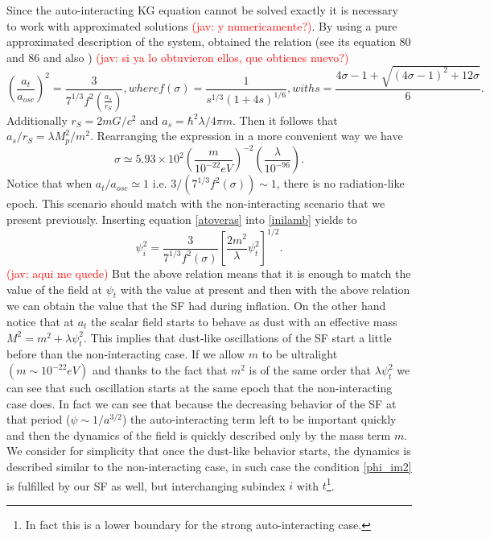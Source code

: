 \documentclass[amssymb,twocolumn,prd,nofootinbib,showpacs]{revtex4-1}
\newcommand{\jav}[1]{\textcolor{red}{(jav: #1)}}
\begin{document}
\begin{itemize}
Since the auto-interacting KG equation cannot be solved exactly it is necessary to work with approximated solutions \jav{y numericamente?}. 
By using a pure approximated description of the system,
 \cite{SFphi42} obtained the relation (see its equation 80 and 86 and also \cite{SFphi41}) 
 \jav{si ya lo obtuvieron ellos, que obtienes nuevo?}
\begin{subequations}
\begin{equation}\label{atoveras}
\left(\frac{a_t}{a_{osc}}\right)^2=\frac{3}{7^{1/3}f^2(\frac{a_s}{r_S})},
\end{equation}
where 
\begin{equation}
f(\sigma)=\frac{1}{s^{1/3}(1+4s)^{1/6}},
\end{equation}
with
\begin{equation}
s=\frac{4\sigma-1+\sqrt{(4\sigma-1)^2+12\sigma}}{6}.
\end{equation}
\end{subequations}
%
Additionally $r_S=2mG/c^2$ and $a_s=\hbar^2\lambda/4\pi m$. 
Then it follows that $a_s/r_S=\lambda M_p^2/m^2$. 
Rearranging the expression in a more convenient way we have
\begin{equation}
\sigma \simeq 5.93\times 10^{
2}\left(\frac{m}{10^{-22}eV}\right)^{-2}\left(\frac{\lambda}{10^{-96}}\right).
\end{equation}
%
Notice that when $a_t/a_{osc}\simeq 1$ i.e.  $3/(7^{1/3}f^2(\sigma))\sim 1$, there is no radiation-like epoch. 
This scenario should match with the non-interacting scenario that we present previously. 
Inserting equation \eqref{atoveras} into \eqref{inilamb} yields to
\begin{equation}\label{inilamb2}
\psi_i^2=\frac{3}{7^{1/3}f^2(\sigma)}\left[\frac{2m^2}{\lambda}\psi_t^2\right]^{1/2}.
\end{equation}
%
\jav{aqui me quede}
But the above relation means that it is enough to match the value of the field at $\psi_t$ with the value at present and then with the above relation we can obtain the value that the SF had during inflation. On the other hand notice that at $a_t$ the scalar field starts to behave as dust with an effective mass $M^2=m^2+\lambda\psi_t^2$. This implies that dust-like oscillations of the SF start a little before than the non-interacting case. If we allow $m$ to be ultralight $(m\sim 10^{-22}eV)$ and thanks to the fact that $m^2$ is of the same order that $\lambda\psi_t^2$ we can see that such oscillation starts at the same epoch that the non-interacting case does. In fact we can see that because the decreasing behavior of the SF at that period ($\psi\sim 1/a^{3/2}$) the auto-interacting term left to be important quickly and then the dynamics of the field is quickly described only by the mass term $m$. We consider for simplicity that once the dust-like behavior starts, the dynamics is described similar to  the non-interacting case, in such case the condition \eqref{phi_im2} is fulfilled by our SF as well, but interchanging subindex $i$ with $t$\footnote{In fact this is a lower boundary for the strong auto-interacting case.}.
\end{itemize}
\end{document}
